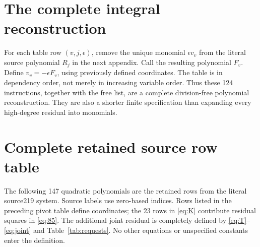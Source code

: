 \documentclass[11pt]{article}
\theoremstyle{definition}\newtheorem{definition}[theorem]{Definition}
\theoremstyle{remark}\newtheorem{remark}[theorem]{Remark}
\begin{document}
\section{The complete integral reconstruction}
\label{app:pivots}
For each table row $(v,j,\epsilon)$, remove the unique monomial
$\epsilon v_v$ from the literal source polynomial $R_j$ in the next
appendix. Call the resulting polynomial $F_v$. Define
$v_v=-\epsilon F_v$, using previously defined coordinates. The table
is in dependency order, not merely in increasing variable order.
Thus these 124 instructions, together with the free list, are a
complete division-free polynomial reconstruction. They are also a
shorter finite specification than expanding every high-degree
residual into monomials.


\clearpage
\section{Complete retained source row table}
\label{app:source}
The following 147 quadratic polynomials are the retained rows from
the literal source219 system. Source labels use zero-based indices.
Rows listed in the preceding pivot table define coordinates; the 23
rows in \eqref{eq:K} contribute residual squares in \eqref{eq:85}.
The additional joint residual is completely defined by
\eqref{eq:T}--\eqref{eq:joint} and Table~\ref{tab:requests}.
No other equations or unspecified constants enter the definition.


\end{document}
